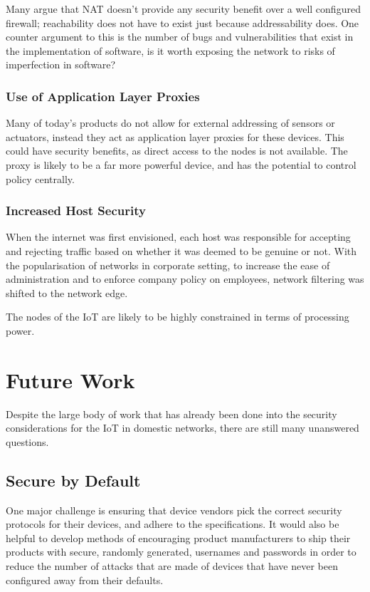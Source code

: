 \documentclass[10pt,journal,compsoc]{IEEEtran}
\begin{document}
Many argue that NAT doesn't provide any security benefit over a well configured
firewall; reachability does not have to exist just because addressability does.
One counter argument to this is the number of bugs and vulnerabilities that
exist in the implementation of software, is it worth exposing the network to
risks of imperfection in software?

\subsubsection{Use of Application Layer Proxies}
Many of today's products do not allow for external addressing of sensors or
actuators, instead they act as application layer proxies for these devices.
This could have security benefits, as direct access to the nodes is not
available. The proxy is likely to be a far more powerful device, and has the
potential to control policy centrally. 

\subsubsection{Increased Host Security}
When the internet was first envisioned, each host was responsible for accepting
and rejecting traffic based on whether it was deemed to be genuine or not. With
the popularisation of networks in corporate setting, to increase the ease of
administration and to enforce company policy on employees, network filtering
was shifted to the network edge.

The nodes of the IoT are likely to be highly constrained in terms of processing
power. 


\section{Future Work}
Despite the large body of work that has already been done into the security
considerations for the IoT in domestic networks, there are still many
unanswered questions. 

\subsection{Secure by Default}
One major challenge is ensuring that device vendors pick the correct security
protocols for their devices, and adhere to the specifications. It would also be
helpful to develop methods of encouraging product manufacturers to ship their
products with secure, randomly generated, usernames and passwords in order to
reduce the number of attacks that are made of devices that have never been
configured away from their defaults.
\end{document}

